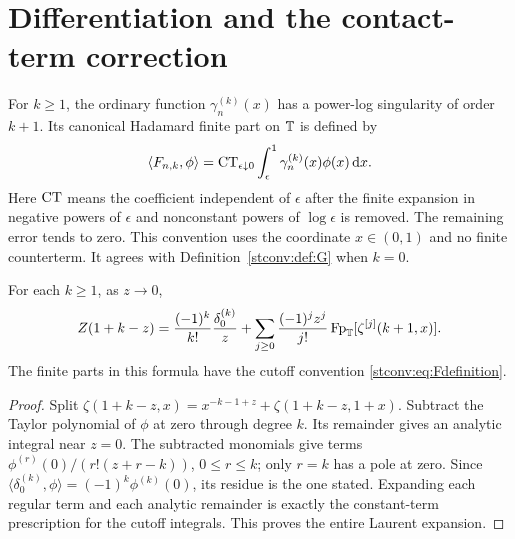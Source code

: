 \section{Differentiation and the contact-term correction}
\label{stconv:sec:contact}
For $k\ge1$, the ordinary function $\gamma_n^{(k)}(x)$ has a power-log
singularity of order $k+1$. Its canonical Hadamard finite part on $\mathbb T$
is defined by
\begin{equation}\label{stconv:eq:Fdefinition}
 \langle F_{n,k},\phi\rangle
 =\operatorname{CT}_{\epsilon\downarrow0}
       \int_\epsilon^1\gamma_n^{(k)}(x)\phi(x)\,\mathrm d x.
\end{equation}
Here $\operatorname{CT}$ means the coefficient independent of $\epsilon$ after the
finite expansion in negative powers of $\epsilon$ and nonconstant powers
of $\log\epsilon$ is removed. The remaining error tends to zero.
This convention uses the coordinate $x\in(0,1)$ and no finite counterterm.
It agrees with Definition~\ref{stconv:def:G} when $k=0$.

\begin{lemma}\label{stconv:lem:higherpoles}
For each $k\ge1$, as $z\to0$,
\begin{equation}\label{stconv:eq:higherpole}
 Z(1+k-z)=\frac{(-1)^k}{k!}\frac{\delta_0^{(k)}}z
 +\sum_{j\ge0}\frac{(-1)^jz^j}{j!}
           \operatorname{Fp}_{\mathbb T}[\zeta^{[j]}(k+1,x)].
\end{equation}
The finite parts in this formula have the cutoff convention
\eqref{stconv:eq:Fdefinition}.
\end{lemma}
\begin{proof}
Split $\zeta(1+k-z,x)=x^{-k-1+z}+\zeta(1+k-z,1+x)$.
Subtract the Taylor polynomial of $\phi$ at zero through degree $k$.
Its remainder gives an analytic integral near $z=0$. The subtracted
monomials give terms
$\phi^{(r)}(0)/(r!(z+r-k))$, $0\le r\le k$; only $r=k$ has a pole
at zero. Since $\langle\delta_0^{(k)},\phi\rangle=(-1)^k\phi^{(k)}(0)$,
its residue is the one stated. Expanding each regular term and each
analytic remainder is exactly the constant-term prescription for the
cutoff integrals. This proves the entire Laurent expansion.
\end{proof}

